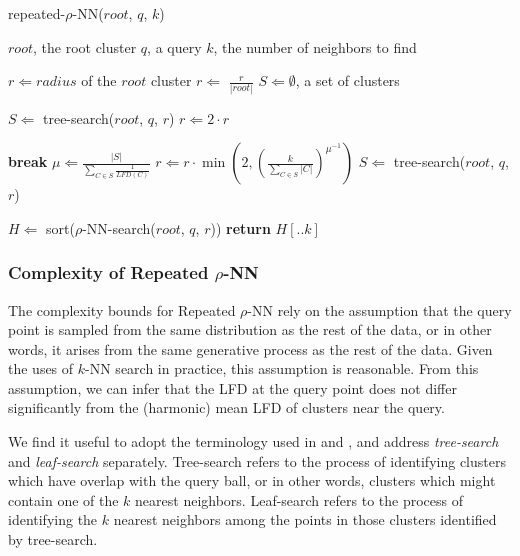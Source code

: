 \begin{algorithm} %
    \caption{repeated-$\rho$-NN($root$, $q$, $k$)} %
    \label{alg:knn:repeated-rnn} %
    \begin{algorithmic} %
        \REQUIRE $root$, the root cluster
        \REQUIRE $q$, a query
        \REQUIRE $k$, the number of neighbors to find

        \STATE $r \Leftarrow radius$ of the $root$ cluster
        \STATE $r \Leftarrow$ $\frac{r}{|root|}$
        \STATE $S \Leftarrow \emptyset$, a set of clusters

            \STATE $S \Leftarrow$ tree-search($root$, $q$, $r$)
            \STATE $r \Leftarrow 2 \cdot r$
        \ENDWHILE

        \ALOOP{}
                \STATE \textbf{break}
            \ENDIF
            \STATE $\mu \Leftarrow \frac{|S|}{\sum_{C \in S} \frac{1}{LFD(C)}}$
            \STATE $r \Leftarrow r \cdot \min \left( 2, \left( {\frac{k}{\sum_{C \in S} |C|}} \right)^{\mu^{-1}} \right)$
            \STATE $S \Leftarrow$ tree-search($root$, $q$, $r$)
        \ENDLOOP

        \STATE $H \Leftarrow$ sort($\rho$-NN-search($root$, $q$, $r$))
        \STATE \textbf{return} $H[.. k]$
    \end{algorithmic}
\end{algorithm}


\subsubsection{Complexity of Repeated \texorpdfstring{$\rho$}{p}-NN}
\label{subsubsec:methods:repeated-rnn-complexity}

The complexity bounds for Repeated $\rho$-NN rely on the assumption that the query point is sampled from the same distribution as the rest of the data, or in other words, it arises from the same generative process as the rest of the data.
Given the uses of $k$-NN search in practice, this assumption is reasonable.
From this assumption, we can infer that the LFD at the query point does not differ significantly from the (harmonic) mean LFD of clusters near the query.

We find it useful to adopt the terminology used in \cite{ishaq2019clustered} and \cite{yu2015entropy}, and address \emph{tree-search} and \emph{leaf-search} separately.
Tree-search refers to the process of identifying clusters which have overlap with the query ball, or in other words, clusters which might contain one of the $k$ nearest neighbors. 
Leaf-search refers to the process of identifying the $k$ nearest neighbors among the points in those clusters identified by tree-search.

